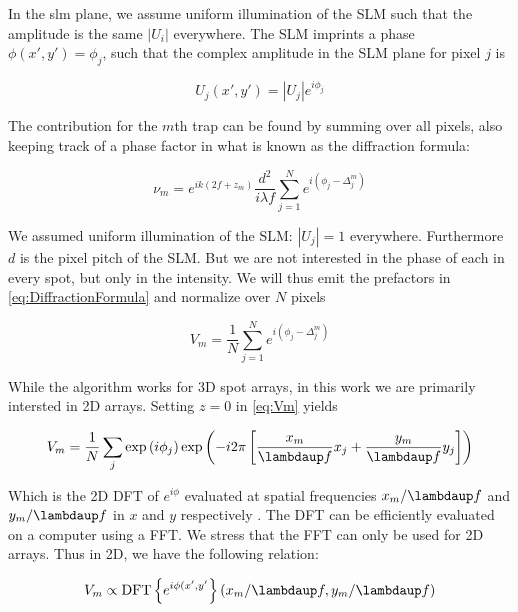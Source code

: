 In the slm plane, we assume uniform illumination of the SLM such that the amplitude is the same $|U_i|$ everywhere. The SLM imprints a phase $\phi(x',y') = \phi_j$, such that the complex amplitude in the SLM plane for pixel $j$ is

\begin{equation}
    U_j(x',y') = |U_j| e^{i \phi_j}
\end{equation}

The contribution for the $m$th trap can be found by summing over all pixels, also keeping track of a phase factor in what is known as the diffraction formula:

\begin{equation}\label{eq:DiffractionFormula}
    \nu_m = e^{i k \left(2 f + z_m\right)}
    \frac{d^2}{i \lambda f} \sum_{j=1}^N e^{i(\phi_j - \Delta_j^m)}
\end{equation}

We assumed uniform illumination of the \ac{SLM}: $|U_j| =1$ everywhere. Furthermore $d$ is the pixel pitch of the SLM. But we are not interested in the phase of each in every spot, but only in the intensity. We will thus emit the prefactors in \cref{eq:DiffractionFormula} and normalize over $N$ pixels

\begin{equation}\label{eq:Vm}
    V_m = \frac{1}{N} \sum_{j=1}^N e^{i(\phi_j - \Delta_j^m)}
\end{equation}

While the algorithm works for 3D spot arrays, in this work we are primarily intersted in 2D arrays. Setting $z=0$ in \cref{eq:Vm} yields 

\begin{equation}
    V_m = \frac{1}{N} \sum_j \exp{\left(i\phi_j\right)} \exp{\left(
    - i 2\pi \left[
    \frac{x_m}{\lambdaup f} x_j + \frac{y_m}{\lambdaup f} y_j
    \right]
    \right)}
\end{equation}

Which is the 2D \ac{DFT} of $e^{i\phi}$ evaluated at spatial frequencies $x_m/\lambdaup f$ and $y_m/\lambdaup f$ in $x$ and $y$ respectively \cite{DiLeonardo2007,Bijnen2015}. The DFT can be efficiently evaluated on a computer using a \ac{FFT}. We stress that the FFT can only be used for 2D arrays. Thus in 2D, we have the following relation:

\begin{equation}
    V_m \propto \text{DFT}\left\{e^{i\phi(x',y'} \right\} 
    \left(x_m / \lambdaup f,y_m / \lambdaup f\right)
\end{equation}                                







